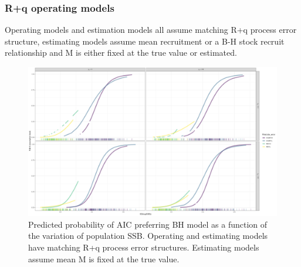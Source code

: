 \documentclass[
  12pt,
]{article}
\begin{document}
\hypertarget{rq-operating-models-1}{%
\subsubsection{R+q operating models}\label{rq-operating-models-1}}

\begin{table}
\caption{Operating models and estimation models all assume matching R+q process error structure, estimating models assume mean recruitment or a B-H stock recruit relationship and M is either fixed at the true value or estimated.}
{}
\end{table}

\begin{figure}
\caption{Predicted probability of AIC preferring BH model as a function of the variation of population SSB. Operating and estimating models have matching R+q process error structures. Estimating models assume mean M is fixed at the true value.}\label{q_om_MF_BH_glm_AIC_plots}
\begin{center}
\includegraphics[width = \textwidth]{q_om_MF_pred_BH_best.png}
\end{center}
\end{figure}
\end{document}
